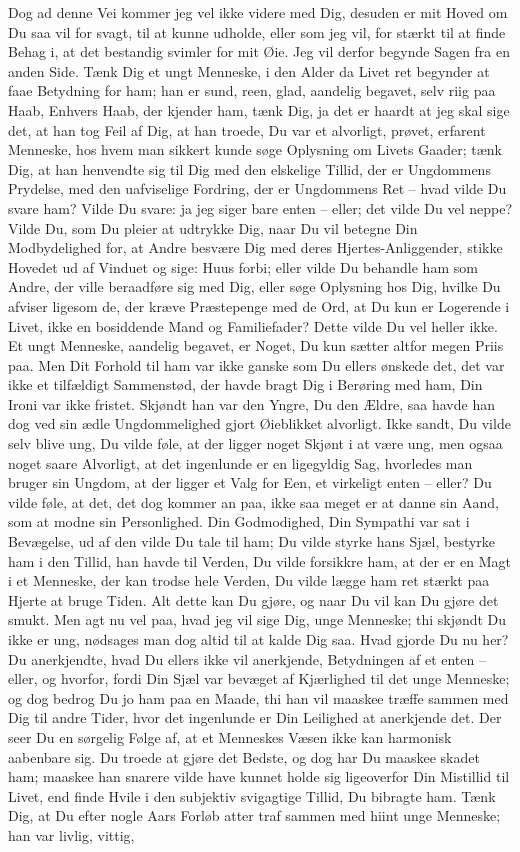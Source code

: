 \documentclass[12pt,a4paper]{article}
\begin{document}
Dog ad denne Vei kommer jeg vel ikke videre med Dig, desuden er mit Hoved om Du saa vil for svagt, til at kunne udholde, eller som jeg vil, for stærkt til at finde Behag i, at det bestandig svimler for mit Øie. Jeg vil derfor begynde Sagen fra en anden Side. Tænk Dig et ungt Menneske, i den Alder da Livet ret begynder at faae Betydning for ham; han er sund, reen, glad, aandelig begavet, selv riig paa Haab, Enhvers Haab, der kjender ham, tænk Dig, ja det er haardt at jeg skal sige det, at han tog Feil af Dig, at han troede, Du var et alvorligt, prøvet, erfarent Menneske, hos hvem man sikkert kunde søge Oplysning om Livets Gaader; tænk Dig, at han henvendte sig til Dig med den elskelige Tillid, der er Ungdommens Prydelse, med den uafviselige Fordring, der er Ungdommens Ret – hvad vilde Du svare ham? Vilde Du svare: ja jeg siger bare enten – eller; det vilde Du vel neppe? Vilde Du, som Du pleier at udtrykke Dig, naar Du vil betegne Din Modbydelighed for, at Andre besvære Dig med deres Hjertes-Anliggender, stikke Hovedet ud af Vinduet og sige: Huus forbi; eller vilde Du behandle ham som Andre, der ville beraadføre sig med Dig, eller søge Oplysning hos Dig, hvilke Du afviser ligesom de, der kræve Præstepenge med de Ord, at Du kun er Logerende i Livet, ikke en bosiddende Mand og Familiefader? Dette vilde Du vel heller ikke. Et ungt Menneske, aandelig begavet, er Noget, Du kun sætter altfor megen Priis paa. Men Dit Forhold til ham var ikke ganske som Du ellers ønskede det, det var ikke et tilfældigt Sammenstød, der havde bragt Dig i Berøring med ham, Din Ironi var ikke fristet. Skjøndt han var den Yngre, Du den Ældre, saa havde han dog ved sin ædle Ungdommelighed gjort Øieblikket alvorligt. Ikke sandt, Du vilde selv blive ung, Du vilde føle, at der ligger noget Skjønt i at være ung, men ogsaa noget saare Alvorligt, at det ingenlunde er en ligegyldig Sag, hvorledes man bruger sin Ungdom, at der ligger et Valg for Een, et virkeligt enten – eller? Du vilde føle, at det, det dog kommer an paa, ikke saa meget er at danne sin Aand, som at modne sin Personlighed. Din Godmodighed, Din Sympathi var sat i Bevægelse, ud af den vilde Du tale til ham; Du vilde styrke hans Sjæl, bestyrke ham i den Tillid, han havde til Verden, Du vilde forsikkre ham, at der er en Magt i et Menneske, der kan trodse hele Verden, Du vilde lægge ham ret stærkt paa Hjerte at bruge Tiden. Alt dette kan Du gjøre, og naar Du vil kan Du gjøre det smukt. Men agt nu vel paa, hvad jeg vil sige Dig, unge Menneske; thi skjøndt Du ikke er ung, nødsages man dog altid til at kalde Dig saa. Hvad gjorde Du nu her? Du anerkjendte, hvad Du ellers ikke vil anerkjende, Betydningen af et enten – eller, og hvorfor, fordi Din Sjæl var bevæget af Kjærlighed til det unge Menneske; og dog bedrog Du jo ham paa en Maade, thi han vil maaskee træffe sammen med Dig til andre Tider, hvor det ingenlunde er Din Leilighed at anerkjende det. Der seer Du en sørgelig Følge af, at et Menneskes Væsen ikke kan harmonisk aabenbare sig. Du troede at gjøre det Bedste, og dog har Du maaskee skadet ham; maaskee han snarere vilde have kunnet holde sig ligeoverfor Din Mistillid til Livet, end finde Hvile i den subjektiv svigagtige Tillid, Du bibragte ham. Tænk Dig, at Du efter nogle Aars Forløb atter traf sammen med hiint unge Menneske; han var livlig, vittig, 
\end{document}
